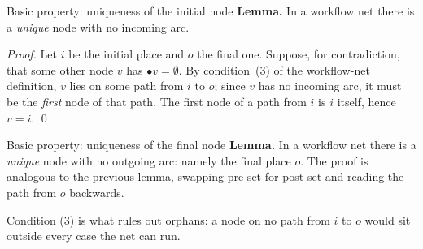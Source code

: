 \begin{notebox}{Basic property: uniqueness of the initial node}
\textbf{Lemma.} In a workflow net there is a \emph{unique} node with no incoming arc.

\medskip

\textit{Proof.} Let $i$ be the initial place and $o$ the final one. Suppose, for contradiction, that some other node $v$ has $\bullet v = \emptyset$. By condition~(3) of the workflow-net definition, $v$ lies on some path from $i$ to $o$; since $v$ has no incoming arc, it must be the \emph{first} node of that path. The first node of a path from $i$ is $i$ itself, hence $v = i$. \qed
\end{notebox}

\begin{notebox}{Basic property: uniqueness of the final node}
\textbf{Lemma.} In a workflow net there is a \emph{unique} node with no outgoing arc: namely the final place $o$. The proof is analogous to the previous lemma, swapping pre-set for post-set and reading the path from $o$ backwards.
\end{notebox}

Condition (3) is what rules out orphans: a node on no path from $i$ to $o$ would sit outside every case the net can run.


